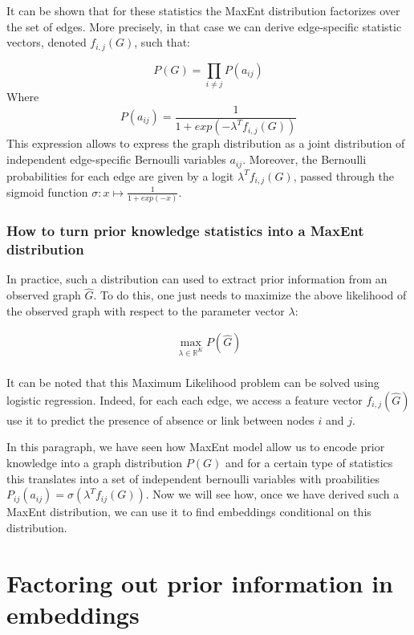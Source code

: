 It can be shown that for these statistics the MaxEnt distribution
factorizes over the set of edges. More precisely, in that case we can
derive edge-specific statistic vectors, denoted \(f_{i,j}(G)\), such
that:

\[P(G)=\prod\limits_{i\neq j} P(a_{ij})\] Where
\[P(a_{ij})= \frac{1}{1+exp(-\lambda^T f_{i,j}(G))}\] This expression
allows to express the graph distribution as a joint distribution of
independent edge-specific Bernoulli variables \(a_{ij}\). Moreover, the
Bernoulli probabilities for each edge are given by a logit
\(\lambda^T f_{i,j}(G)\), passed through the sigmoid function
\(\sigma :x\mapsto \frac{1}{1+exp(-x)}\).

\hypertarget{how-to-turn-prior-knowledge-statistics-into-a-maxent-distribution}{%
\subsubsection{How to turn prior knowledge statistics into a MaxEnt
distribution}\label{how-to-turn-prior-knowledge-statistics-into-a-maxent-distribution}}

In practice, such a distribution can used to extract prior information
from an observed graph \(\hat{G}\). To do this, one just needs to
maximize the above likelihood of the observed graph with respect to the
parameter vector \(\lambda\):

\[
\begin{aligned}
\max\limits_{\lambda\in \mathbb{R}^K} P(\hat{G}) \\
\end{aligned}
\]

It can be noted that this Maximum Likelihood problem can be solved using
logistic regression. Indeed, for each each edge, we access a feature
vector \(f_{i,j}(\hat{G})\) use it to predict the presence of absence or
link between nodes \(i\) and \(j\).

In this paragraph, we have seen how MaxEnt model allow us to encode
prior knowledge into a graph distribution \(P(G)\) and for a certain
type of statistics this translates into a set of independent bernoulli
variables with proabilities
\(P_{ij}(a_{ij})=\sigma(\lambda^Tf_{ij}(G))\). Now we will see how, once
we have derived such a MaxEnt distribution, we can use it to find
embeddings conditional on this distribution.

\hypertarget{factoring-out-prior-information-in-embeddings}{%
\section{Factoring out prior information in
embeddings}\label{factoring-out-prior-information-in-embeddings}}

